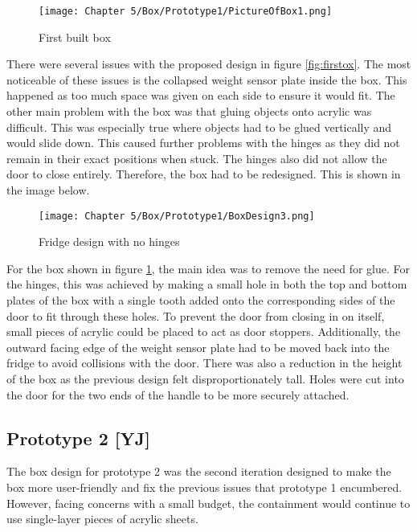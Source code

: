 \begin{figure}[H]        
    \centering
    \texttt{[image: Chapter 5/Box/Prototype1/PictureOfBox1.png]}
    \caption{First built box}
\end{figure} 

There were several issues with the proposed design in figure \ref{fig:firstox}.
The most noticeable of these issues is the collapsed weight sensor plate inside the box.
This happened as too much space was given on each side to ensure it would fit.
The other main problem with the box was that gluing objects onto acrylic was difficult.
This was especially true where objects had to be glued vertically and would slide down.
This caused further problems with the hinges as they did not remain in their exact positions when stuck.
The hinges also did not allow the door to close entirely.
Therefore, the box had to be redesigned.
This is shown in the image below.

\begin{figure}[H]        
    \centering
    \texttt{[image: Chapter 5/Box/Prototype1/BoxDesign3.png]}
    \caption{Fridge design with no hinges}
    \label{fig:hindgless}
\end{figure} 

For the box shown in figure \ref{fig:hindgless}, the main idea was to remove the need for glue.
For the hinges, this was achieved by making a small hole in both the top and bottom plates of the box with a single tooth added onto the corresponding sides of the door to fit through these holes.
To prevent the door from closing in on itself, small pieces of acrylic could be placed to act as door stoppers.
Additionally, the outward facing edge of the weight sensor plate had to be moved back into the fridge to avoid collisions with the door.
There was also a reduction in the height of the box as the previous design felt disproportionately tall.
Holes were cut into the door for the two ends of the handle to be more securely attached.

\subsection{Prototype 2 [YJ]}

The box design for prototype 2 was the second iteration designed to make the box more user-friendly and fix the previous issues that prototype 1 encumbered.
However, facing concerns with a small budget, the containment would continue to use single-layer pieces of acrylic sheets.

